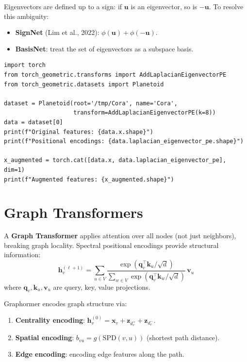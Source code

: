 \begin{warning}[title=\textbf{Sign ambiguity}]
Eigenvectors are defined up to a sign: if $\mathbf{u}$ is an eigenvector,
so is $-\mathbf{u}$. To resolve this ambiguity:
\begin{itemize}
    \item \textbf{SignNet} (Lim et al., 2022): $\phi(\mathbf{u}) + \phi(-\mathbf{u})$.
    \item \textbf{BasisNet}: treat the set of eigenvectors as a subspace basis.
\end{itemize}
\end{warning}

\begin{codeblock}[title=\textbf{Spectral positional encodings}]
\begin{verbatim}
import torch
from torch_geometric.transforms import AddLaplacianEigenvectorPE
from torch_geometric.datasets import Planetoid

dataset = Planetoid(root='/tmp/Cora', name='Cora',
                    transform=AddLaplacianEigenvectorPE(k=8))
data = dataset[0]
print(f"Original features: {data.x.shape}")
print(f"Positional encodings: {data.laplacian_eigenvector_pe.shape}")

x_augmented = torch.cat([data.x, data.laplacian_eigenvector_pe], dim=1)
print(f"Augmented features: {x_augmented.shape}")
\end{verbatim}
\end{codeblock}

\section{Graph Transformers}

\begin{definition}
A \textbf{Graph Transformer} applies attention over all nodes (not just
neighbors), breaking graph locality. Spectral positional encodings provide
structural information:
\[
    \mathbf{h}_v^{(\ell+1)} = \sum_{u \in V} \frac{\exp(\mathbf{q}_v^\top \mathbf{k}_u / \sqrt{d})}
    {\sum_{w \in V} \exp(\mathbf{q}_v^\top \mathbf{k}_w / \sqrt{d})}\, \mathbf{v}_u
\]
where $\mathbf{q}_v, \mathbf{k}_u, \mathbf{v}_u$ are query, key, value projections.
\end{definition}

\begin{remark}
Graphormer encodes graph structure via:
\begin{enumerate}
    \item \textbf{Centrality encoding}: $\mathbf{h}_v^{(0)} = \mathbf{x}_v + \mathbf{z}_{d_v^+} + \mathbf{z}_{d_v^-}$.
    \item \textbf{Spatial encoding}: $b_{vu} = g(\text{SPD}(v, u))$ (shortest path distance).
    \item \textbf{Edge encoding}: encoding edge features along the path.
\end{enumerate}
\end{remark}

